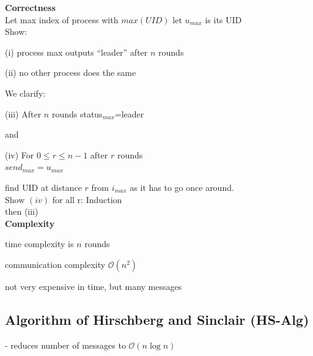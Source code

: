 \textbf{Correctness}\\
Let max index of process with $max(UID)$ let $u_{max}$ is its UID\\
Show:\\
\begin{compactitem}
\item[(i)] process max outputs ``leader'' after $n$ rounds
\item[(ii)] no other process does the same
\end{compactitem}

We clarify:\\
\begin{compactitem}
\item[(iii)] After $n$ rounds status$_{max}$=leader
\end{compactitem}
and\\
\begin{compactitem}
\item[(iv)] For $0\leq r\leq n-1$ after $r$ rounds\\
	$send_{max}=u_{max}$
\end{compactitem}
find UID at distance $r$ from $i_{max}$ as it has to go once around.\\

Show $(iv)$ for all r: Induction\\
then (iii)\\

\textbf{Complexity}\\
\begin{compactitem}
\item time complexity is $n$ rounds
\item communication complexity $\mathcal{O}(n^2)$
\item not very expensive in time, but many messages

\end{compactitem}

\subsection{Algorithm of Hirschberg and Sinclair (HS-Alg)}
- reduces number of messages to $\mathcal{O}(n \log n)$\\

